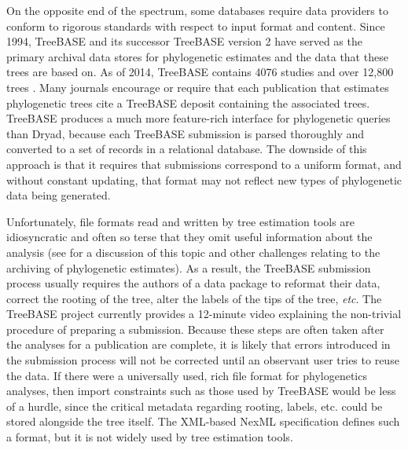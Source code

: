 \documentclass{bioinfo}
\begin{document}
On the opposite end of the spectrum, some databases require data providers to conform to rigorous
    standards with respect to input format and content.
Since 1994, TreeBASE \citep{SandersonDPE1994} and its successor TreeBASE version 2 \citep{TreeBase2} have served
    as the primary archival data stores for phylogenetic estimates and the data that these trees are based on.
As of 2014, TreeBASE contains 4076 studies and over 12,800 trees \citep{TreeBaseWebCite}.
Many journals encourage or require that each publication that estimates phylogenetic trees cite a TreeBASE
    deposit containing the associated trees.
TreeBASE produces a much more feature-rich interface for phylogenetic queries than Dryad, because each 
    TreeBASE submission is parsed thoroughly and converted to a set of records in a relational database.
The downside of this approach is that it requires that submissions correspond to a uniform format, and without constant updating,
    that format may not reflect new types of phylogenetic data being generated.

Unfortunately, file formats read and written by tree estimation tools are idiosyncratic and often so 
    terse that they omit useful information about the analysis (see \citet{StoltzfusEtAl2012} for a discussion
    of this topic and other challenges relating to the archiving of phylogenetic estimates).
As a result, the TreeBASE submission process usually requires the authors of a data package to reformat their data, correct
    the rooting of the tree, alter the labels of the tips of the tree, {\em etc}.
The TreeBASE project currently provides a 12-minute video 
    explaining the non-trivial procedure of preparing a submission.
Because these steps are often taken after the analyses for a publication are complete, it is likely that
    errors introduced in the submission process will not be corrected until an observant user tries to reuse the data.
If there were a universally used, rich file format for phylogenetics analyses, then import constraints such as those
    used by TreeBASE would be less of a hurdle, since the critical metadata regarding rooting, labels, etc. could be
    stored alongside the tree itself.
The XML-based NexML specification \citep{NeXML} defines such a format, but it is not widely used by tree estimation tools.
\end{document}
